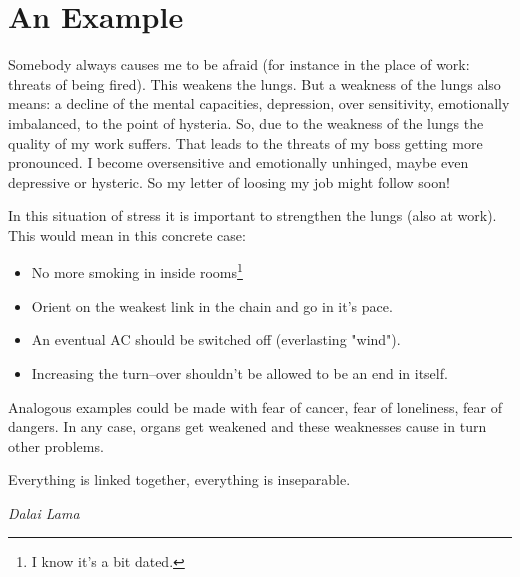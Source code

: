 \documentclass[../Book.Stress_regulation.tex]{subfiles}
\begin{document}
\section{An Example}

Somebody always causes me to be afraid (for instance in the place of work: threats of being fired).
This weakens the lungs.
But a weakness of the lungs also means: a decline of the mental capacities, depression, over sensitivity, emotionally imbalanced, to the point of hysteria.
So, due to the weakness of the lungs the quality of my work suffers. That leads to the threats of my boss getting more pronounced.
I become oversensitive and emotionally unhinged, maybe even depressive or hysteric. So my letter of loosing my job might follow soon!

In this situation of stress it is important to strengthen the lungs (also at work). This would mean in this concrete case:

\begin{itemize}
	\item No more smoking in inside rooms\footnote{I know it's a bit dated.}
	\item Orient on the weakest link in the chain and go in it's pace.
	\item An eventual AC should be switched off (everlasting "wind").
	\item Increasing the turn--over shouldn't be allowed to be an end in itself.
\end{itemize}

Analogous examples could be made with fear of cancer, fear of loneliness, fear of dangers. In any case, organs get weakened and these weaknesses cause in turn other problems.



\epigraph{Everything is linked together, everything is inseparable.}{\textit{Dalai Lama}}
\setlength{} 
\end{document}
